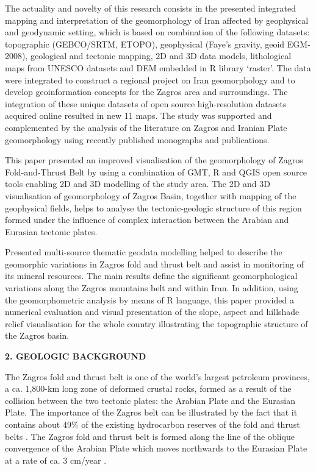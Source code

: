 \documentclass[12pt,a4paper,oneside]{article}
\def \newsection{\vspace{12pt}\textbf}
\def \newpar{\vspace{6pt}}
\begin{document}
\newpar The actuality and novelty of this research consists in the presented integrated mapping and interpretation of the geomorphology of Iran affected by geophysical and geodynamic setting, which is based on combination of the following datasets: topographic (GEBCO/SRTM, ETOPO), geophysical (Faye's gravity, geoid EGM-2008), geological and tectonic mapping, 2D and 3D data models, lithological maps from UNESCO datasets and DEM embedded in R library ‘raster’. The data were integrated to construct a regional project on Iran geomorphology and to develop geoinformation concepts for the Zagros area and surroundings. The integration of these unique datasets of open source high-resolution datasets acquired online resulted in new 11 maps. The study was supported and complemented by the analysis of the literature on Zagros and Iranian Plate geomorphology using recently published monographs and publications.

\newpar This paper presented an improved visualisation of the geomorphology of Zagros Fold-and-Thrust Belt by using a combination of GMT, R and QGIS open source tools enabling 2D and 3D modelling of the study area. The 2D and 3D visualisation of geomorphology of Zagros Basin, together with mapping of the geophysical fields, helps to analyse the tectonic-geologic structure of this region formed under the influence of complex interaction between the Arabian and Eurasian tectonic plates.

\newpar Presented multi-source thematic geodata modelling helped to describe the geomorphic variations in Zagros fold and thrust belt and assist in monitoring of its mineral resources. The main results define the significant geomorphological variations along the Zagros mountains belt and within Iran. In addition, using the geomorphometric analysis by means of R language, this paper provided a numerical evaluation and visual presentation of the slope, aspect and hillshade relief visualisation for the whole country illustrating the topographic structure of the Zagros basin.

\newsection {2. GEOLOGIC BACKGROUND}

\newpar The Zagros fold and thrust belt is one of the world's largest petroleum provinces, a ca. 1,800-km long zone of deformed crustal rocks, formed as a result of the collision between the two tectonic plates: the Arabian Plate and the Eurasian Plate. The importance of the Zagros belt can be illustrated by the fact that it contains about 49\% of the existing hydrocarbon reserves of the fold and thrust belts \cite{Cooper}. The Zagros fold and thrust belt is formed along the line of the oblique convergence of the Arabian Plate which moves northwards to the Eurasian Plate at a rate of ca. 3 cm/year \cite{Talebian}. 
\end{document}
